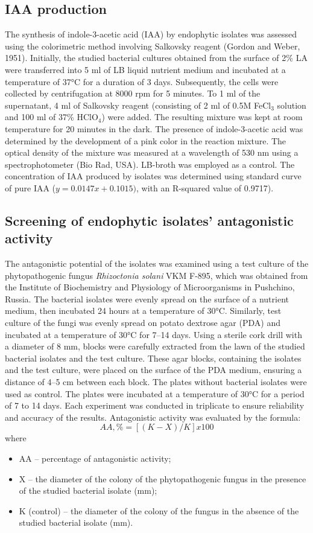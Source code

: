 \documentclass[sn-mathphys,Numbered]{sn-jnl}%
\theoremstyle{thmstyleone}%
\theoremstyle{thmstyletwo}%
\theoremstyle{thmstylethree}%
\begin{document}
\subsection*{IAA production}
The synthesis of indole-3-acetic acid (IAA) by endophytic isolates was assessed using the colorimetric method involving Salkovsky reagent (Gordon and Weber, 1951). Initially, the studied bacterial cultures obtained from the surface of 2\% LA were transferred into 5 ml of LB liquid nutrient medium and incubated at a temperature of 37°C for a duration of 3 days. Subsequently, the cells were collected by centrifugation at 8000 rpm for 5 minutes. To 1 ml of the supernatant, 4 ml of Salkovsky reagent (consisting of 2 ml of 0.5M FeCl$_3$ solution and 100 ml of 37\% HClO$_4$) were added. The resulting mixture was kept at room temperature for 20 minutes in the dark. The presence of indole-3-acetic acid was determined by the development of a pink color in the reaction mixture. The optical density of the mixture was measured at a wavelength of 530 nm using a spectrophotometer (Bio Rad, USA). LB-broth was employed as a control. The concentration of IAA produced by isolates was determined using standard curve of pure IAA ($y = 0.0147x + 0.1015)$, with an R-squared value of 0.9717).

\subsection*{Screening of endophytic isolates' antagonistic activity}

The antagonistic potential of the isolates was examined using a test culture of the phytopathogenic fungus \textit{Rhizoctonia solani} VKM F-895, which was obtained from the Institute of Biochemistry and Physiology of Microorganisms in Pushchino, Russia.
The bacterial isolates were evenly spread on the surface of a nutrient medium, then incubated 24 hours at a temperature of 30°C. Similarly, test culture of the fungi was evenly spread on potato dextrose agar (PDA) and incubated at a temperature of 30°C for 7–14 days.
Using a sterile cork drill with a diameter of 8 mm, blocks were carefully extracted from the lawn of the studied bacterial isolates and the test culture. These agar blocks, containing the isolates and the test culture, were placed on the surface of the PDA medium, ensuring a distance of 4–5 cm between each block. The plates without bacterial isolates were used as control. The plates were incubated at a temperature of 30°C for a period of 7 to 14 days. Each experiment was conducted in triplicate to ensure reliability and accuracy of the results.
Antagonistic activity was evaluated by the formula:
$$ AA,\% =  [(K-X)/K] x100 $$
where\begin{itemize}
    \item AA – percentage of antagonistic activity;
    \item X – the diameter of the colony of the phytopathogenic fungus in the presence of the studied bacterial isolate (mm);
    \item K (control) – the diameter of the colony of the fungus in the absence of the studied bacterial isolate (mm).
\end{itemize}
\end{document}
